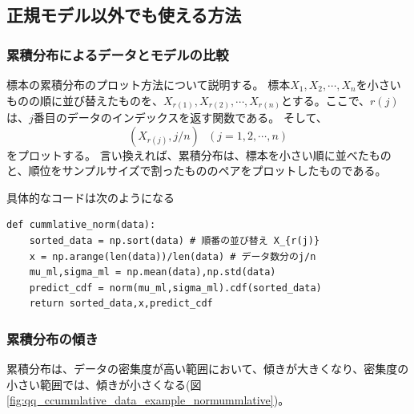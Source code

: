 

\subsection{正規モデル以外でも使える方法}



\subsubsection{累積分布によるデータとモデルの比較}

標本の累積分布のプロット方法について説明する。
標本$X_1,X_2,\cdots,X_n$を小さいものの順に並び替えたものを、$X_{r(1)},X_{r(2)},\cdots,X_{r(n)}$とする。ここで、$r(j)$は、$j$番目のデータのインデックスを返す関数である。
そして、
\begin{equation*}
    (X_{r(j)},j/n) \ \ \ (j=1,2,\cdots,n)
\end{equation*}
をプロットする。
言い換えれば、累積分布は、標本を小さい順に並べたものと、順位をサンプルサイズで割ったもののペアをプロットしたものである。

具体的なコードは次のようになる
\begin{lstlisting}
def cummlative_norm(data):
    sorted_data = np.sort(data) # 順番の並び替え X_{r(j)}
    x = np.arange(len(data))/len(data) # データ数分のj/n 
    mu_ml,sigma_ml = np.mean(data),np.std(data)
    predict_cdf = norm(mu_ml,sigma_ml).cdf(sorted_data)
    return sorted_data,x,predict_cdf
\end{lstlisting}

\subsubsection{累積分布の傾き}
累積分布は、データの密集度が高い範囲において、傾きが大きくなり、密集度の小さい範囲では、傾きが小さくなる(図\ref{fig:qq_ccummlative_data_example_normummlative})。



